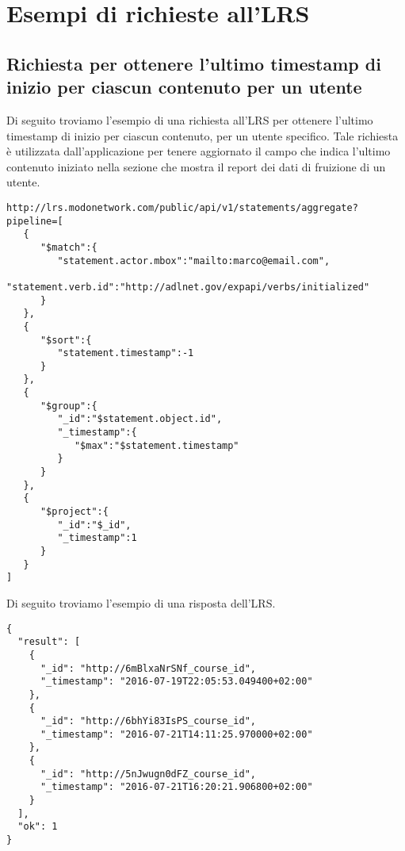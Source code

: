 \section{Esempi di richieste all'LRS} \label{App:AppendixB}
    \subsection{Richiesta per ottenere l'ultimo timestamp di inizio per ciascun contenuto per un utente}
    Di seguito troviamo l'esempio di una richiesta all'LRS per ottenere l'ultimo timestamp di inizio per ciascun contenuto, per un utente specifico. Tale richiesta è utilizzata dall'applicazione per tenere aggiornato il campo che indica l'ultimo contenuto iniziato nella sezione che mostra il report dei dati di fruizione di un utente.
\begin{lstlisting}
http://lrs.modonetwork.com/public/api/v1/statements/aggregate?pipeline=[
   {
      "$match":{
         "statement.actor.mbox":"mailto:marco@email.com",
         "statement.verb.id":"http://adlnet.gov/expapi/verbs/initialized"
      }
   },
   {
      "$sort":{
         "statement.timestamp":-1
      }
   },
   {
      "$group":{
         "_id":"$statement.object.id",
         "_timestamp":{
            "$max":"$statement.timestamp"
         }
      }
   },
   {
      "$project":{
         "_id":"$_id",
         "_timestamp":1
      }
   }
]
\end{lstlisting}
    
    Di seguito troviamo l'esempio di una risposta dell'LRS.
\begin{lstlisting}
{
  "result": [
    {
      "_id": "http://6mBlxaNrSNf_course_id",
      "_timestamp": "2016-07-19T22:05:53.049400+02:00"
    },
    {
      "_id": "http://6bhYi83IsPS_course_id",
      "_timestamp": "2016-07-21T14:11:25.970000+02:00"
    },
    {
      "_id": "http://5nJwugn0dFZ_course_id",
      "_timestamp": "2016-07-21T16:20:21.906800+02:00"
    }
  ],
  "ok": 1
}
\end{lstlisting}

